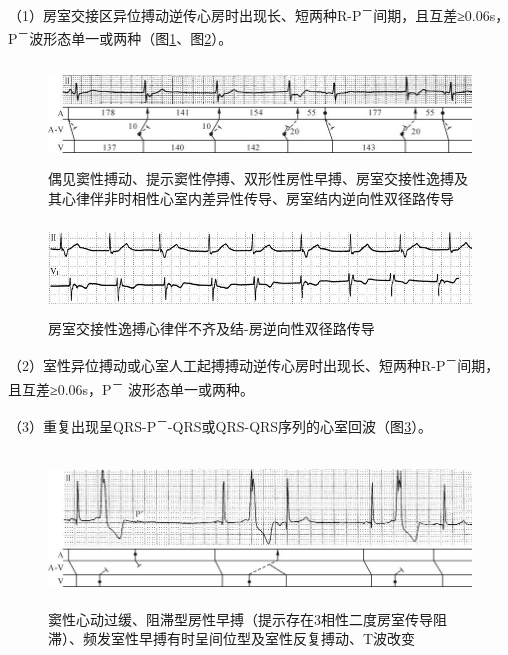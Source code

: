 （1）房室交接区异位搏动逆传心房时出现长、短两种R-P\textsuperscript{－}间期，且互差≥0.06s，P\textsuperscript{－}波形态单一或两种（图\ref{fig25-14}、图\ref{fig25-15}）。

\begin{figure}[!htbp]
 \centering
 \includegraphics[width=5.77083in,height=1.0625in]{./images/Image00425.jpg}
 \captionsetup{justification=centering}
 \caption{偶见窦性搏动、提示窦性停搏、双形性房性早搏、房室交接性逸搏及其心律伴非时相性心室内差异性传导、房室结内逆向性双径路传导}
 \label{fig25-14}
  \end{figure} 

\begin{figure}[!htbp]
 \centering
 \includegraphics[width=5.60417in,height=0.95833in]{./images/Image00426.jpg}
 \captionsetup{justification=centering}
 \caption{房室交接性逸搏心律伴不齐及结-房逆向性双径路传导}
 \label{fig25-15}
  \end{figure} 

（2）室性异位搏动或心室人工起搏搏动逆传心房时出现长、短两种R-P\textsuperscript{－}间期，且互差≥0.06s，P\textsuperscript{－} 波形态单一或两种。

（3）重复出现呈QRS-P\textsuperscript{－}-QRS或QRS-QRS序列的心室回波（图\ref{fig25-16}）。

\begin{figure}[!htbp]
 \centering
 \includegraphics[width=5.78125in,height=1.61458in]{./images/Image00427.jpg}
 \captionsetup{justification=centering}
 \caption{窦性心动过缓、阻滞型房性早搏（提示存在3相性二度房室传导阻滞）、频发室性早搏有时呈间位型及室性反复搏动、T波改变}
 \label{fig25-16}
  \end{figure} 

